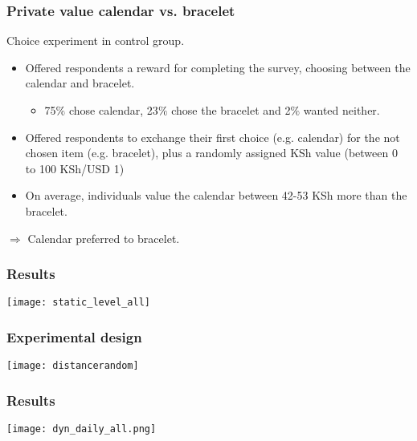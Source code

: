 \documentclass{beamer}
\theoremstyle{plain}
\begin{document}
\begin{frame}[label=slide101]
\frametitle{\large{Private value calendar vs. bracelet}}
Choice experiment in control group.
\smallskip
\begin{itemize}
\item Offered respondents a reward for completing the survey, choosing between the calendar and bracelet. 
\begin{itemize}
\item \large{75$\%$ chose calendar, 23$\%$ chose the bracelet and 2$\%$ wanted neither.}
\end{itemize}
\smallskip
\item Offered respondents to exchange their first choice (e.g. calendar) for the not chosen item (e.g. bracelet), plus a randomly assigned KSh value (between 0 to 100 KSh/USD 1)
\item On average, individuals value the calendar between 42-53 KSh more than the bracelet.
\end{itemize}
\smallskip
$\Rightarrow$ \large{Calendar preferred to bracelet.}
\hyperlink{slide13}{}  
\end{frame}


\begin{frame}[label=slide102]
\frametitle{\large{Results}}
\begin{center}
\texttt{[image: static\_level\_all]}
\end{center}
\hyperlink{slide21}{} 
\end{frame}

\begin{frame}[label=slide103]
\frametitle{\large{Experimental design}}
\begin{center}
\texttt{[image: distancerandom]}
\end{center}
\hyperlink{slide22}{} 
\end{frame}

\begin{frame}[label=slide104]
\frametitle{\large{Results}}
\begin{center}
\texttt{[image: dyn\_daily\_all.png]}
\end{center}
\end{frame}
\end{document}
